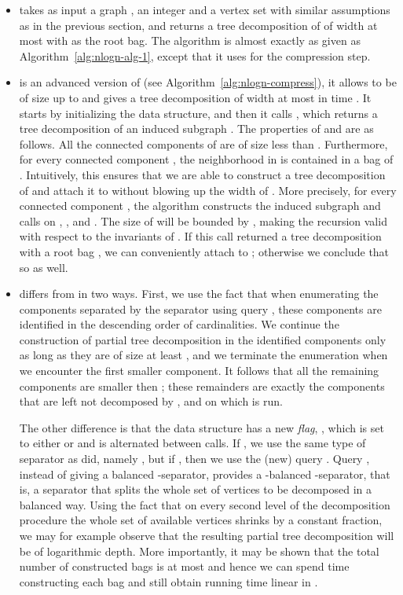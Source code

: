 \documentclass[a4paper,11pt]{article}
\theoremstyle{definition}
\theoremstyle{remark}
\begin{document}
\begin{itemize}
\item  takes as input a graph , an integer  and a
  vertex set  with similar assumptions as in the previous
  section, and returns a tree decomposition  of  of width at
  most  with  as the root bag.  The algorithm is almost
  exactly as  given as Algorithm~\ref{alg:nlogn-alg-1},
  except that it uses  for the compression step.
\item  is an advanced version of 
  (see Algorithm~\ref{alg:nlogn-compress}), it allows  to be of
  size up to  and gives a tree decomposition of width at most
   in time .  It starts by
  initializing the data structure, and then it calls , which
  returns a tree decomposition  of an induced subgraph .  The properties of  and  are as follows.
  All the connected components  of 
  are of size less than .  Furthermore, for every connected
  component , the neighborhood  in  is contained in a
  bag of .  Intuitively, this ensures that we are able to
  construct a tree decomposition of  and attach it to 
  without blowing up the width of .  More precisely, for every
  connected component , the algorithm constructs the induced
  subgraph  and calls  on
  , , and . The size of  will be bounded by
  , making the recursion valid with respect to the invariants of
  . If this call returned a tree decomposition 
  with a root bag , we can conveniently attach  to
  ; otherwise we conclude that  so
   as well.
\item  differs from  in two ways.  First, we use
  the fact that when enumerating the components separated by the
  separator using query , these components are identified in
  the descending order of cardinalities.  We continue the construction
  of partial tree decomposition in the identified components only as
  long as they are of size at least , and we terminate the
  enumeration when we encounter the first smaller component.  It
  follows that all the remaining components are smaller then ;
  these remainders are exactly the components  that
  are left not decomposed by , and on which
   is run.
  
  The other difference is that the data structure has a new
  \emph{flag}, , which is set to either  or  and is
  alternated between calls.  If , we use the same type
  of separator as  did, namely , but if , then we use the (new) query .  Query , instead
  of giving a balanced -separator, provides a
  -balanced -separator, that is, a separator that
  splits the whole set  of vertices to be decomposed in a balanced
  way.  Using the fact that on every second level of the decomposition
  procedure the whole set of available vertices shrinks by a constant
  fraction, we may for example observe that the resulting partial tree
  decomposition will be of logarithmic depth.  More importantly, it
  may be shown that the total number of constructed bags is at most
   and hence we can spend  time
  constructing each bag and still obtain running time linear in .
\end{itemize}
\end{document}
